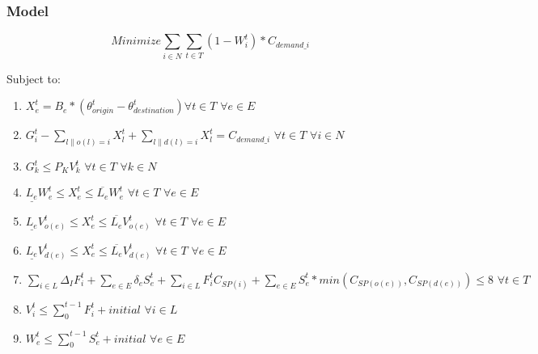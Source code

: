 \documentclass{article}
\begin{document}
	\subsubsection{Model}
	$$	Minimize \sum_{i \in N} \sum_{t \in T} (1-W_i^t)*C_{demand\_i} $$
	
	Subject to:
	\begin{enumerate}[label=(\arabic*), leftmargin=*, itemsep=0.4ex, before={\everymath{\displaystyle}}]%
		
		\item $ X_e^t = B_e * (\theta_{origin}^t - \theta_{destination}^t) \forall t \in T \hspace{4pt} \forall e \in E$
		\item $ G_i^t - \sum_{l\|o(l)=i} X_l^t + \sum_{l\|d(l)=i} X_l^t = C_{demand\_i} \hspace{4pt} \forall t \in T \hspace{4pt} \forall i \in N$
		\item $G_k^t \leq P_{K} V_{k}^t \hspace{4pt} \forall t\in T \hspace{4pt} \forall k \in N$
		\item $\underline{L_e}W_{e}^t \leq X_{e}^t \leq \overline{L_e}W_{e}^t \hspace{4pt} \forall t \in T \hspace{4pt} \forall e \in E$
		\item $\underline{L_e}V_{o(e)}^t \leq X_{e}^t \leq \overline{L_e}V_{o(e)}^t \hspace{4pt} \forall t \in T \hspace{4pt} \forall e \in E$
		\item $\underline{L_e}V_{d(e)}^t \leq X_{e}^t \leq \overline{L_e}V_{d(e)}^t \hspace{4pt} \forall t \in T \hspace{4pt} \forall e \in E$
		
		\item $\sum_{i \in L} \Delta_{I} F_{i}^t +\sum_{e \in E} \delta_{e} S_{e}^t + \sum_{i \in L} F_i^t C_{SP(i)} + \sum_{e \in E} S_{e}^t * min(C_{SP(o(e))},C_{SP(d(e))}) \leq 8 \hspace{4pt} \forall t \in T \hspace{4pt}$
		\item $V_i^t \leq \sum_{0}^{t-1} F_i^t+initial \hspace{4pt} \forall i \in L$ 
		\item $W_{e}^t \leq \sum_{0}^{t-1} S_{e}^t+initial \hspace{4pt} \forall e \in E $
	\end{enumerate}
\end{document}
